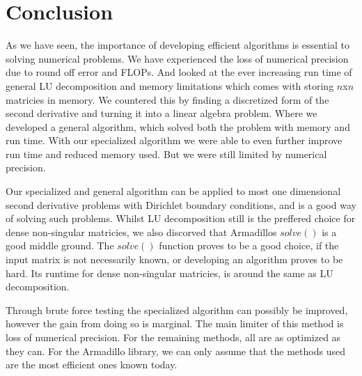 \documentclass[10pt, a4paper]{amsart}
\begin{document}
\section{Conclusion}
As we have seen, the importance of developing efficient algorithms is essential to solving numerical problems. We have experienced the loss of numerical precision due to round off error and FLOPs. And looked at the ever increasing run time of general LU decomposition and memory limitations which comes with storing $n$x$n$ matricies in memory. 
We countered this by finding a discretized form of the second derivative and turning it into a linear algebra problem. Where we developed a general algorithm, which solved both the problem with memory and run time. With our specialized algorithm we were able to even further improve run time and reduced memory used. But we were still limited by numerical precision. 

Our specialized and general algorithm can be applied to most one dimensional second derivative problems with Dirichlet boundary conditions, and is a good way of solving such problems. Whilst LU decomposition still is the preffered choice for dense non-singular matricies, we also discorved that Armadillos $solve()$ is a good middle ground. The $solve()$ function proves to be a good choice, if the input matrix is not necessarily known, or developing an algorithm proves to be hard. Its runtime for dense non-singular matricies, is around the same as LU decomposition. 

Through brute force testing the specialized algorithm can possibly be improved, however the gain from doing so is marginal. The main limiter of this method is loss of numerical precision. For the remaining methods, all are as optimized as they can\cite{morten}. 
For the Armadillo\cite{Sanderson2016}\cite{DBLP:journals/corr/abs-1805-03380} library, we can only assume that the methods used are the most efficient ones known today. 

\end{document}
